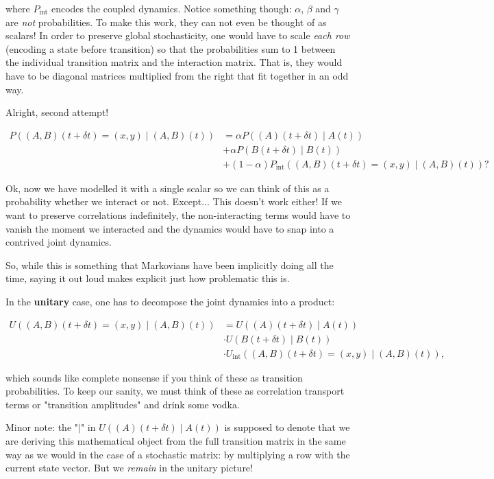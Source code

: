 \documentclass{article}
\begin{document}
where $P_{\text{int}}$ encodes the coupled dynamics. Notice something though: $\alpha$, $\beta$ and $\gamma$ are \textit{not} probabilities. To make this work, they can not even be thought of as scalars! In order to preserve global stochasticity, one would have to scale \textit{each row} (encoding a state before transition) so that the probabilities sum to 1 between the individual transition matrix and the interaction matrix. That is, they would have to be diagonal matrices multiplied from the right that fit together in an odd way.

Alright, second attempt!

\begin{align*}
 P((A,B)(t+\delta t) = (x,y)\mid (A,B)(t)) &= \alpha P((A)(t + \delta t)\mid A(t))\\ & + \alpha P(B(t+\delta t) \mid B(t)) \\ & + (1-\alpha) P_{\text{int}}((A,B)(t+\delta t) = (x,y)\mid (A,B)(t))? 
\end{align*}

Ok, now we have modelled it with a single scalar so we can think of this as a probability whether we interact or not. Except... This doesn't work either! If we want to preserve correlations indefinitely, the non-interacting terms would have to vanish the moment we interacted and the dynamics would have to snap into a contrived joint dynamics.

So, while this is something that Markovians have been implicitly doing all the time, saying it out loud makes explicit just how problematic this is.

In the \textbf{unitary} case, one has to decompose the joint dynamics into a product:

\begin{align*}
 U((A,B)(t+\delta t) = (x,y)\mid (A,B)(t)) &= U((A)(t + \delta t)\mid A(t))\\ & \cdot U(B(t+\delta t) \mid B(t)) \\ & \cdot U_{\text{int}}((A,B)(t+\delta t) = (x,y)\mid (A,B)(t)),
 \end{align*}

which sounds like complete nonsense if you think of these as transition probabilities. To keep our sanity, we must think of these as correlation transport terms or "transition amplitudes" and drink some vodka.

Minor note: the "$\mid$" in $U((A)(t + \delta t)\mid A(t))$ is supposed to denote that we are deriving this mathematical object from the full transition matrix in the same way as we would in the case of a stochastic matrix: by multiplying a row with the current state vector. But we \textit{remain} in the unitary picture!
\end{document}
